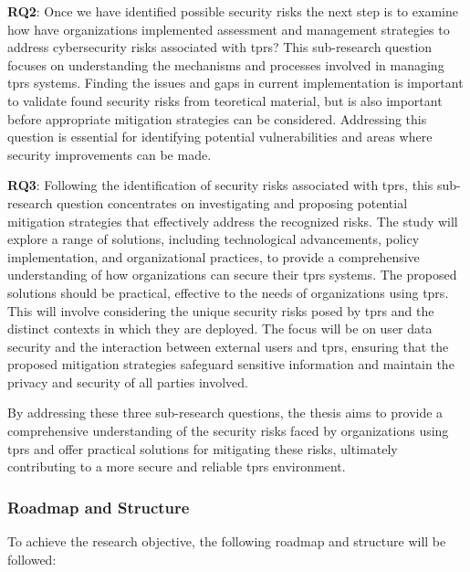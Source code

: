 \textbf{RQ2}: Once we have identified possible security risks the next step is to examine how have organizations implemented assessment
and management strategies to address cybersecurity risks associated with \ac{tprs}? This sub-research question focuses on understanding
the mechanisms and processes involved in managing \ac{tprs} systems. Finding the issues and gaps in current implementation is important to validate found security risks from teoretical material, but is also important before appropriate mitigation strategies can be considered. Addressing this question is essential for identifying potential vulnerabilities and areas where security improvements can be made.

\textbf{RQ3}: Following the identification of security risks associated with \ac{tprs}, this sub-research question concentrates on investigating and proposing potential mitigation strategies that effectively address the recognized risks. The study will explore a range of solutions, including technological advancements, policy implementation, and organizational practices, to provide a comprehensive understanding of how organizations can secure their \ac{tprs} systems. The proposed solutions should be practical, effective to the needs of organizations using \ac{tprs}.
  This will involve considering the unique security risks posed by \ac{tprs} and the distinct contexts in which they are deployed.
  The focus will be on user data security and the interaction between external users and \ac{tprs}, ensuring that the proposed mitigation strategies safeguard sensitive information and maintain the privacy and security of all parties involved.


By addressing these three sub-research questions, the thesis aims to provide a comprehensive understanding of the security risks faced by
organizations using \ac{tprs} and offer practical solutions for mitigating these risks, ultimately contributing to a more secure and
reliable \ac{tprs} environment.

\subsubsection{Roadmap and Structure}

To achieve the research objective, the following roadmap and structure will be followed:

